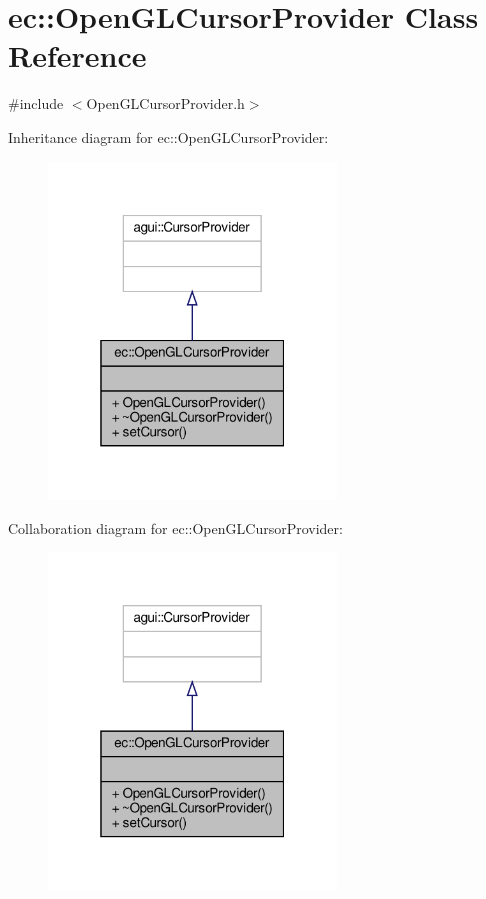 \hypertarget{classec_1_1_open_g_l_cursor_provider}{}\section{ec\+:\+:Open\+G\+L\+Cursor\+Provider Class Reference}
\label{classec_1_1_open_g_l_cursor_provider}


{\ttfamily \#include $<$Open\+G\+L\+Cursor\+Provider.\+h$>$}



Inheritance diagram for ec\+:\+:Open\+G\+L\+Cursor\+Provider\+:\nopagebreak
\begin{figure}[H]
\begin{center}
\leavevmode
\includegraphics[width=217pt]{classec_1_1_open_g_l_cursor_provider__inherit__graph}
\end{center}
\end{figure}


Collaboration diagram for ec\+:\+:Open\+G\+L\+Cursor\+Provider\+:\nopagebreak
\begin{figure}[H]
\begin{center}
\leavevmode
\includegraphics[width=217pt]{classec_1_1_open_g_l_cursor_provider__coll__graph}
\end{center}
\end{figure}
